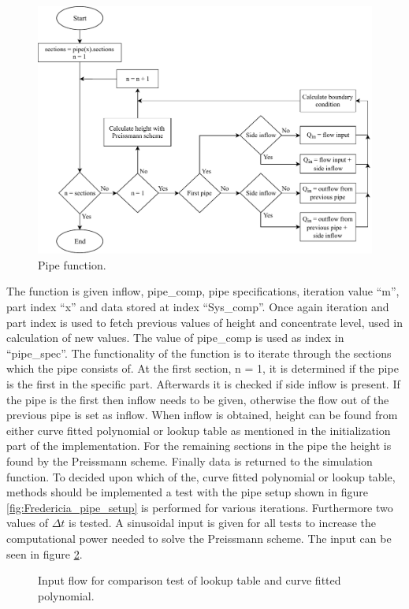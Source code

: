 \begin{figure}[H]
\centering
\includegraphics[width=0.9 \textwidth]{report/simulation/pictures/pipe_function.pdf}
\caption{Pipe function.}
\label{fig:pipe_function}
\end{figure}

The function is given inflow, pipe\_comp, pipe specifications, iteration value ``m'', part index ``x'' and data stored at index ``Sys\_comp''.
Once again iteration and part index is used to fetch previous values of height and concentrate level, used in calculation of new values. The value of pipe\_comp is used as index in ``pipe\_spec''. The functionality of the function is to iterate through the sections which the pipe consists of.
At the first section, n = 1, it is determined if the pipe is the first in the specific part. Afterwards it is checked if side inflow is present. If the pipe is the first then inflow needs to be given, otherwise the flow out of the previous pipe is set as inflow. When inflow is obtained, height can be found from either curve fitted polynomial or lookup table as mentioned in the initialization part of the implementation. For the remaining sections in the pipe the height is found by the Preissmann scheme. Finally data is returned to the simulation function.
To decided upon which of the, curve fitted polynomial or lookup table, methods should be implemented a test with the pipe setup shown in figure \ref{fig:Fredericia_pipe_setup} is performed for various iterations. Furthermore two values of $\Delta t$ is tested. A  sinusoidal input is given for all tests to increase the computational power needed to solve the Preissmann scheme. The input can be seen in figure \ref{fig:comparison_look_fit_input}.
\begin{figure}[H]
 \centering
 
\caption{Input flow for comparison test of lookup table and curve fitted polynomial.}
\label{fig:comparison_look_fit_input}
\end{figure} 

